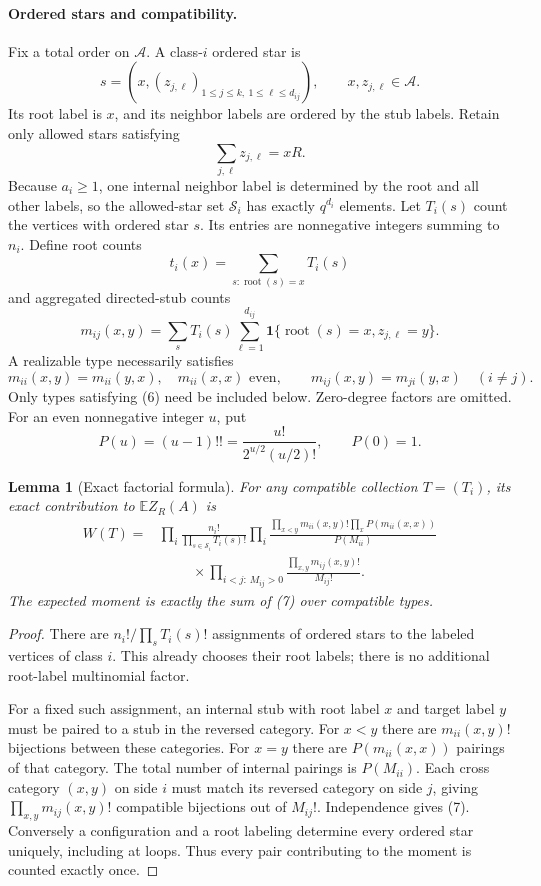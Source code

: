 \documentclass[11pt]{article}
\newtheorem{lemma}{Lemma}
\newcommand{\E}{\mathbb E}
\newcommand{\OO}{\mathcal A}
\begin{document}
\paragraph{Ordered stars and compatibility.}
Fix a total order on $\OO$. A class-$i$ ordered star is
\[
 s=(x,(z_{j,\ell})_{1\leq j\leq k,\ 1\leq\ell\leq d_{ij}}),
 \qquad x,z_{j,\ell}\in\OO.
\]
Its root label is $x$, and its neighbor labels are ordered by the stub
labels. Retain only allowed stars satisfying
\[
 \sum_{j,\ell}z_{j,\ell}=xR.                         \tag{4}
\]
Because $a_i\geq1$, one internal neighbor label is determined by the root
and all other labels, so the allowed-star set $\mathcal S_i$ has exactly
$q^{d_i}$ elements. Let $T_i(s)$ count the vertices with ordered star $s$.
Its entries are nonnegative integers summing to $n_i$. Define root counts
\[
 t_i(x)=\sum_{s:\operatorname{root}(s)=x}T_i(s)
\]
and aggregated directed-stub counts
\[
 m_{ij}(x,y)=\sum_sT_i(s)
       \sum_{\ell=1}^{d_{ij}}
       \boldsymbol1\{\operatorname{root}(s)=x,z_{j,\ell}=y\}.
 \tag{5}
\]
A realizable type necessarily satisfies
\[
 m_{ii}(x,y)=m_{ii}(y,x),\quad m_{ii}(x,x)\text{ even},\qquad
 m_{ij}(x,y)=m_{ji}(y,x)\quad(i\ne j).                 \tag{6}
\]
Only types satisfying (6) need be included below. Zero-degree factors
are omitted. For an even nonnegative integer $u$, put
\[
 P(u)=(u-1)!!=\frac{u!}{2^{u/2}(u/2)!},\qquad P(0)=1.
\]

\begin{lemma}[Exact factorial formula]
For any compatible collection $T=(T_i)$, its exact contribution to
$\E Z_R(A)$ is
\begin{align}
 W(T)={}&\prod_i\frac{n_i!}{\prod_{s\in\mathcal S_i}T_i(s)!}
 \prod_i\frac{
     \prod_{x<y}m_{ii}(x,y)!\prod_xP(m_{ii}(x,x))}{P(M_{ii})}
 \nonumber\\[-2pt]
 &\hspace{1cm}\times\prod_{i<j:\,M_{ij}>0}
      \frac{\prod_{x,y}m_{ij}(x,y)!}{M_{ij}!}.
 \tag{7}
\end{align}
The expected moment is exactly the sum of (7) over compatible types.
\end{lemma}
\begin{proof}
There are $n_i!/\prod_sT_i(s)!$ assignments of ordered stars to the
labeled vertices of class $i$. This already chooses their root labels;
there is no additional root-label multinomial factor.

For a fixed such assignment, an internal stub with root label $x$ and
target label $y$ must be paired to a stub in the reversed category. For
$x<y$ there are $m_{ii}(x,y)!$ bijections between these categories. For
$x=y$ there are $P(m_{ii}(x,x))$ pairings of that category. The total
number of internal pairings is $P(M_{ii})$. Each cross category $(x,y)$
on side $i$ must match its reversed category on side $j$, giving
$\prod_{x,y}m_{ij}(x,y)!$ compatible bijections out of $M_{ij}!$.
Independence gives (7). Conversely a configuration and a root labeling
determine every ordered star uniquely, including at loops. Thus every
pair contributing to the moment is counted exactly once.
\end{proof}
\end{document}
